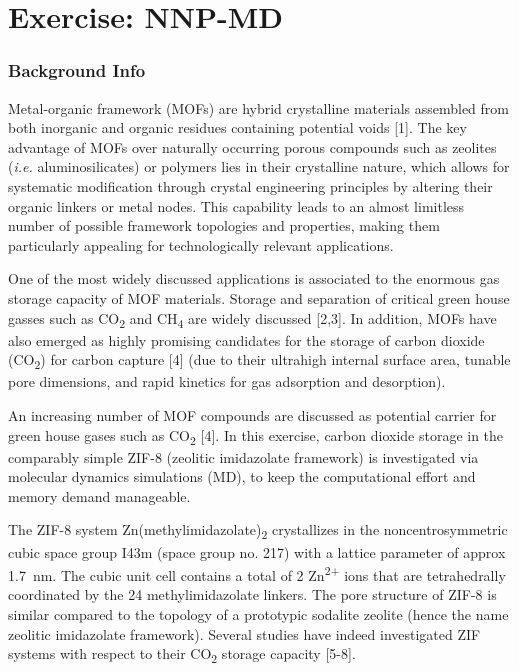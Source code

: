 \documentclass[
  letterpaper,
]{article}
\begin{document}
\part{Exercise: NNP-MD}

\hypertarget{background-info}{%
\section{Background Info}\label{background-info}}

Metal-organic framework (MOFs) are hybrid crystalline materials
assembled from both inorganic and organic residues containing potential
voids {[}1{]}. The key advantage of MOFs over naturally occurring porous
compounds such as zeolites (\emph{i.e.} aluminosilicates) or polymers
lies in their crystalline nature, which allows for systematic
modification through crystal engineering principles by altering their
organic linkers or metal nodes. This capability leads to an almost
limitless number of possible framework topologies and properties, making
them particularly appealing for technologically relevant applications.

One of the most widely discussed applications is associated to the
enormous gas storage capacity of MOF materials. Storage and separation
of critical green house gasses such as CO\textsubscript{2} and
CH\textsubscript{4} are widely discussed {[}2,3{]}. In addition, MOFs
have also emerged as highly promising candidates for the storage of
carbon dioxide (CO\textsubscript{2}) for carbon capture {[}4{]} (due to
their ultrahigh internal surface area, tunable pore dimensions, and
rapid kinetics for gas adsorption and desorption).

An increasing number of MOF compounds are discussed as potential carrier
for green house gases such as CO\textsubscript{2} {[}4{]}. In this
exercise, carbon dioxide storage in the comparably simple ZIF-8
(zeolitic imidazolate framework) is investigated via molecular dynamics
simulations (MD), to keep the computational effort and memory demand
manageable.

The ZIF-8 system Zn(methylimidazolate)\textsubscript{2} crystallizes in
the noncentrosymmetric cubic space group I43m (space group no. 217) with
a lattice parameter of approx 1.7~nm. The cubic unit cell contains a
total of 2 Zn\textsuperscript{2+} ions that are tetrahedrally
coordinated by the 24 methylimidazolate linkers. The pore structure of
ZIF-8 is similar compared to the topology of a prototypic sodalite
zeolite (hence the name zeolitic imidazolate framework). Several studies
have indeed investigated ZIF systems with respect to their
CO\textsubscript{2} storage capacity {[}5-8{]}.
\end{document}
